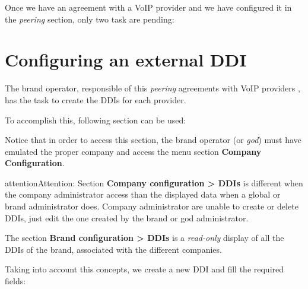 \documentclass[letterpaper,10pt,english]{sphinxmanual}
\begin{document}
Once we have an agreement with a VoIP provider and we have configured it in
the \emph{peering} section, only two task are pending:


\section{Configuring an external DDI}
\label{external_incoming_calls/configure_ddi:settingup-ddi}\label{external_incoming_calls/configure_ddi:configuring-an-external-ddi}\label{external_incoming_calls/configure_ddi::doc}
The brand operator, responsible of this \emph{peering} agreements with VoIP providers
, has the task to create the DDIs for each provider.

To accomplish this, following section can be used:


Notice that in order to access this section, the brand operator (or \emph{god})
must have emulated the proper company and access the menu section \textbf{Company
Configuration}.

\begin{notice}{attention}{Attention:}
Section \textbf{Company configuration \textgreater{} DDIs} is different when the
company administrator access than the displayed data when a global or brand
administrator does. Company administrator are unable to create or delete
DDIs, just edit the one created by the brand or god administrator.
\end{notice}

The section \textbf{Brand configuration \textgreater{} DDIs} is a \emph{read-only} display of all the
DDIs of the brand, associated with the different companies.


Taking into account this concepts, we create a new DDI and fill the required
fields:
\end{document}
